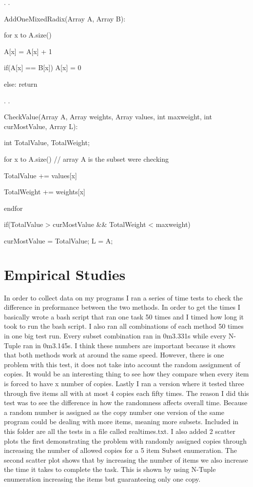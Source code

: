 \documentclass[paper=a4, fontsize=11pt]{scrartcl} %
\numberwithin{equation}{section} %
\numberwithin{figure}{section} %
\numberwithin{table}{section} %
\begin{document}
. \newline
. \newline
\begin{AddOne}
AddOneMixedRadix(Array A, Array B):
    \item for x to A.size()
    \item A[x] = A[x] + 1
    \item if(A[x] == B[x]) A[x] = 0
    \item else: return
\end{AddOne}
. \newline
. \newline
\begin{CheckValue}
    \item CheckValue(Array A, Array weights, Array values, int maxweight, int curMostValue, Array L):
    \item int TotalValue, TotalWeight;
    \item for x to A.size() // array A is the subset were checking
    \item TotalValue += values[x]
    \item TotalWeight += weights[x]
    \item endfor
    \item if(TotalValue > curMostValue && TotalWeight < maxweight) 
    \item curMostValue = TotalValue; L = A;
\end{CheckValue}


\section{Empirical Studies}


In order to collect data on my programs I ran a series of time tests to check the difference in preformance between the two methods. In order to get the times I basically wrote a bash script that ran one task 50 times and I timed how long it took to run the bash script. I also ran all combinations of each method 50 times in one big test run. Every subset combination ran in 0m3.331s while every N-Tuple ran in 0m3.145s. I think these numbers are important because it shows that both methods work at around the same speed. However, there is one problem with this test, it does not take into account the random assignment of copies. It would be an interesting thing to see how they compare when every item is forced to have x number of copies. Lastly I ran a version where it tested three through five items all with at most 4 copies each fifty times. The reason I did this test was to see the difference in how the randomness affects overall time. Because a random number is assigned as the copy number one version of the same program could be dealing with more items, meaning more subsets. Included in this folder are all the tests in a file called realtimes.txt. I also added 2 scatter plots the first demonstrating the problem with randomly assigned copies through increasing the number of allowed copies for a 5 item Subset enumeration. The second scatter plot shows that by increasing the number of items we also increase the time it takes to complete the task. This is shown by using N-Tuple enumeration increasing the items but guaranteeing only one copy.
\end{document}
